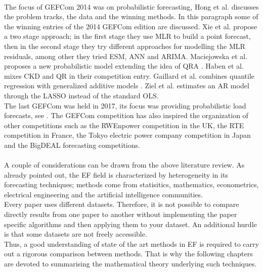 \\
The focus of GEFCom 2014 was on probabilistic forecasting, Hong et al. \cite{hong2016probabilistic} discusses the problem tracks, the data and the winning methods.
In this paragraph some of the winning entries of the 2014 GEFCom edition are discussed.
Xie et al. \cite{xie2016gefcom2014} propose a two stage approach; in the first stage they use MLR to build a point forecast, then in the second stage they try different approaches for modelling the MLR residuals, among other they tried ESM, ANN and ARIMA. 
Maciejowska et al. \cite{maciejowska2016hybrid} proposes a new probabilistic model extending the idea of QRA \cite{nowotarski2015computing}.
Haben et al. \cite{haben2016hybrid} mixes CKD and QR in their competition entry.
Gaillard et al. \cite{gaillard2016additive} \cite{gaillardasemi} combines quantile regression with generalized additive models \cite{hastie2017generalized}.
Ziel et al. \cite{ziel2016lasso} estimates an AR model through the LASSO \cite{tibshirani1996regression} instead of the standard OLS.
\\
The last GEFCom was held in 2017, its focus was providing probabilistic load forecasts, see \cite{hong2019global}. The GEFCom competition has also inspired the organization of other competitions such as the RWEnpower competition in the UK, the RTE competition in France, the Tokyo electric power company competition in Japan and the BigDEAL forecasting competitions.
\\
\\
A couple of considerations can be drawn from the above literature review.
As already pointed out, the EF field is characterized by heterogeneity in its forecasting techniques; methods come from statisitics, mathematics, econometrics, electrical engineering and the artificial intelligence communities.
\\
Every paper uses different datasets.
Therefore, it is not possible to compare directly results from one paper to another without implementing the paper specific algorithms and then applying them to your dataset. An additional hurdle is that some datasets are not freely accessible.
\\
Thus, a good understanding of state of the art methods in EF is required to carry out a rigorous comparison between methods.
That is why the following chapters are devoted to summarising the mathematical theory underlying such techniques.

